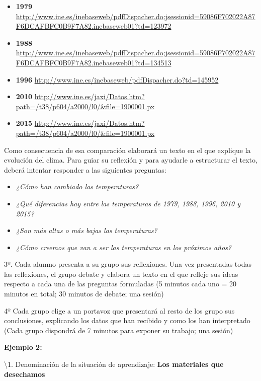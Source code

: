 \documentclass[
]{article}
\providecommand{\tightlist}{%
  \setlength{\itemsep}{0pt}\setlength{\parskip}{0pt}}
\begin{document}
\begin{itemize}
\tightlist
\item
  \textbf{1979}
  \url{http://www.ine.es/inebaseweb/pdfDispacher.do;jsessionid=59086F702022A87F6DCAFBFC0B9F7A82.inebaseweb01?td=123972}
\item
  \textbf{1988}
  h\href{http://www.ine.es/inebaseweb/pdfDispacher.do;jsessionid=59086F702022A87F6DCAFBFC0B9F7A82.inebaseweb01?td=134513}{ttp://www.ine.es/inebaseweb/pdfDispacher.do;jsessionid=59086F702022A87F6DCAFBFC0B9F7A82.inebaseweb01?td=134513}
\item
  \textbf{1996}
  \url{http://www.ine.es/inebaseweb/pdfDispacher.do?td=145952}
\item
  \textbf{2010}
  \url{http://www.ine.es/jaxi/Datos.htm?path=/t38/p604/a2000/l0/\&file=1900001.px}
\item
  \textbf{2015}
  \url{http://www.ine.es/jaxi/Datos.htm?path=/t38/p604/a2000/l0/\&file=1900001.px}
\end{itemize}

Como consecuencia de esa comparación elaborará un texto en el que
explique la evolución del clima. Para guiar su reflexión y para ayudarle
a estructurar el texto, deberá intentar responder a las siguientes
preguntas:

\begin{itemize}
\tightlist
\item
  \emph{¿Cómo han cambiado las temperaturas?}
\item
  \emph{¿Qué diferencias hay entre las temperaturas de 1979, 1988, 1996,
  2010 y 2015?}
\item
  \emph{¿Son más altas o más bajas las temperaturas?}
\item
  \emph{¿Cómo creemos que van a ser las temperaturas en los próximos
  años?}
\end{itemize}

3º. Cada alumno presenta a su grupo sus reflexiones. Una vez presentadas
todas las reflexiones, el grupo debate y elabora un texto en el que
refleje sus ideas respecto a cada una de las preguntas formuladas (5
minutos cada uno = 20 minutos en total; 30 minutos de debate; una
sesión)

4º Cada grupo elige a un portavoz que presentará al resto de los grupo
sus conclusiones, explicando los datos que han recibido y como los han
interpretado (Cada grupo dispondrá de 7 minutos para exponer su trabajo;
una sesión)

\textbf{Ejemplo 2:}

\textbackslash1. Denominación de la situación de aprendizaje:
\textbf{Los materiales que desechamos}
\end{document}
